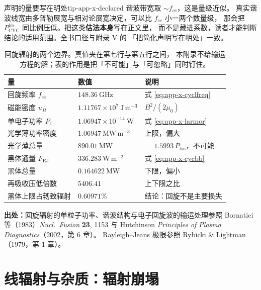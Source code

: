 \begin{tip}{声明的量要写在明处}{tip-app-x-declared}
谐波带宽取 $\sim f_{ce}$，这是量级近似。
真实谐波线宽由多普勒展宽与相对论展宽决定，可以比 $f_{ce}$ 小一两个数量级，
那会把 $P_{\mathrm{CYC}}^{\mathrm{bb}}$ 同比例压低。把这类\textbf{估法本身}写在正文里，
而不是藏进系数，读者才能判断结论的适用范围。全书口径与附录 V 的
「把简化声明写在明处」一致。
\end{tip}

\begin{table}[htbp]
\centering
\small
\caption{回旋辐射的两个边界。真值夹在第七行与第五行之间，
本附录不给输运方程的解；表的作用是把「不可能」与「可忽略」同时钉住。}
\label{tab:app-x-cyclotron}
\begin{tabular}{p{4.4cm}p{3.4cm}p{4.8cm}}
\toprule
量 & 数值 & 说明 \\
\midrule
回旋频率 $f_{ce}$ & $148.36\ \mathrm{GHz}$ & 式 \eqref{eq:app-x-cyclfreq} \\
磁能密度 $u_B$ & $1.11767\times10^{7}\ \mathrm{J\,m^{-3}}$ & $B^2/(2\mu_0)$ \\
单电子功率 $P_1$ & $1.06947\times10^{-14}\ \mathrm{W}$ & 式 \eqref{eq:app-x-larmor} \\
光学薄功率密度 & $1.06947\ \mathrm{MW\,m^{-3}}$ & 上限，偏大 \\
光学薄总量 & $890.01\ \mathrm{MW}$ & $=1.5993\,P_{\mathrm{fus}}$，不可能 \\
黑体通量 $F_{\mathrm{RJ}}$ & $336.283\ \mathrm{W\,m^{-2}}$ & 式 \eqref{eq:app-x-cycbb} \\
黑体总量 & $0.164622\ \mathrm{MW}$ & 下限，偏小 \\
再吸收压低倍数 & $5406.41$ & 上下限之比 \\
黑体上限占轫致辐射 & $0.60971\%$ & 结论：回旋不是主要损失 \\
\bottomrule
\end{tabular}

\end{table}

{\footnotesize
\textbf{出处：}回旋辐射的单粒子功率、谐波结构与电子回旋波的输运处理参照
Bornatici 等（1983）\emph{Nucl.\ Fusion} \textbf{23}, 1153 与
Hutchinson \emph{Principles of Plasma Diagnostics}（2002，第 6 章）。
Rayleigh--Jeans 极限参照 Rybicki \& Lightman（1979，第 1 章）。
}

\section{线辐射与杂质：辐射崩塌}
\label{sec:app-x-line}

